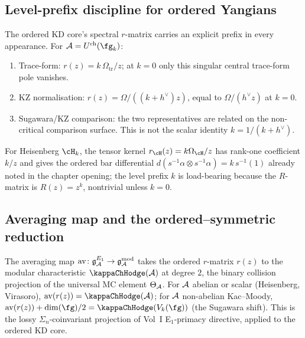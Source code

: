\subsection{Level-prefix discipline for ordered Yangians}
\label{subsec:ordered-kd-core-rmatrix-level-prefix}

\begin{remark}
\label{rem:ordered-kd-core-rmatrix-level-prefix}
The ordered KD core's spectral $r$-matrix carries an explicit
prefix in every appearance. For $\cA = U^{\mathrm{ch}}(\fg_k)$:
\begin{enumerate}[label=\textup{(\roman*)}]
\item Trace-form: $r(z) = k\,\Omega_{\mathrm{tr}}/z$; at \(k=0\) only this
singular central trace-form pole vanishes.
\item KZ normalisation: $r(z) = \Omega/((k+h^\vee)z)$, equal to
$\Omega/(h^\vee z)$ at $k=0$.
\item Sugawara/KZ comparison: the two representatives are related on
the non-critical comparison surface. This is not the scalar identity
\(k=1/(k+h^\vee)\).
\end{enumerate}
For Heisenberg $\cH_k$, the tensor kernel
$r_{\cH}(z)=k\Omega_{\cH}/z$ has rank-one coefficient $k/z$ and gives the
ordered bar differential
$d(s^{-1}\alpha\otimes s^{-1}\alpha) = k\, s^{-1}(1)$
already noted in the chapter opening; the level prefix $k$ is
load-bearing because the $R$-matrix is $R(z) = z^k$, nontrivial
unless $k=0$.
\end{remark}

\subsection{Averaging map and the ordered--symmetric reduction}
\label{subsec:ordered-kd-core-averaging}

\begin{proposition}
\label{prop:ordered-kd-core-averaging-modular}
The averaging map
$\mathrm{av}\colon \mathfrak{g}^{E_1}_{\mathcal{A}} \to
\mathfrak{g}^{\mathrm{mod}}_{\mathcal{A}}$ takes the ordered $r$-matrix
$r(z)$ to the modular characteristic $\kappaChHodge(\cA)$ at degree $2$,
the binary collision projection of the universal MC element
$\Theta_{\mathcal{A}}$. For $\mathcal{A}$ abelian or scalar (Heisenberg, Virasoro),
$\mathrm{av}(r(z)) = \kappaChHodge(\cA)$; for $\mathcal{A}$ non-abelian
Kac--Moody, $\mathrm{av}(r(z)) + \dim(\fg)/2 = \kappaChHodge(V_k(\fg))$
(the Sugawara shift). This is the lossy
$\Sigma_n$-coinvariant projection of Vol~I E$_1$-primacy directive,
applied to the ordered KD core.
\end{proposition}

